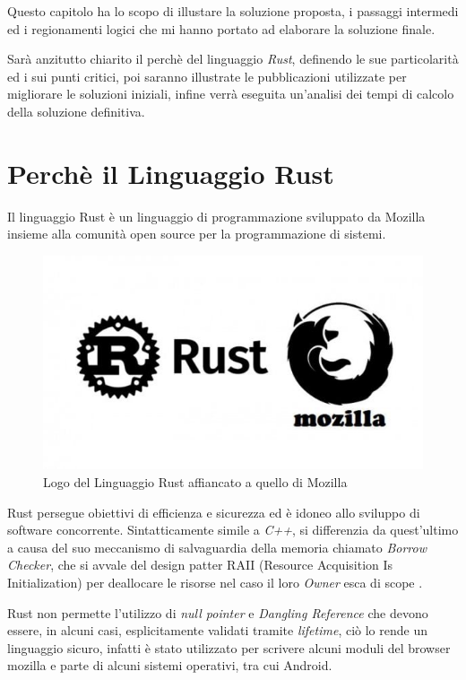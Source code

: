 Questo capitolo ha lo scopo di illustare la soluzione proposta, i passaggi intermedi ed i regionamenti logici che mi hanno portato ad elaborare la soluzione finale.

Sarà anzitutto chiarito il perchè del linguaggio \textit{Rust}, definendo le sue particolarità ed i sui punti critici, poi saranno illustrate le pubblicazioni utilizzate per migliorare le soluzioni iniziali, infine verrà eseguita un'analisi dei tempi di calcolo della soluzione definitiva.

\section{Perchè il Linguaggio Rust}
Il linguaggio Rust è un linguaggio di programmazione sviluppato da Mozilla insieme alla comunità open source per la programmazione di sistemi.

\begin{figure}
    \centering
    \includegraphics[scale=0.5]{images/rustlang.jpg}
    \caption{Logo del Linguaggio Rust affiancato a quello di Mozilla}
    \label{fig:rustlang1}
\end{figure}

Rust persegue obiettivi di efficienza e sicurezza ed è idoneo allo sviluppo di software concorrente. Sintatticamente simile a \textit{C++}, si differenzia da quest'ultimo a causa del suo meccanismo di salvaguardia della memoria chiamato \textit{Borrow Checker}, che si avvale del design patter \textsc{RAII} (Resource Acquisition Is Initialization) per deallocare le risorse nel caso il loro \textit{Owner} esca di scope \cite{10.5555/3271463}.

Rust non permette l'utilizzo di \textit{null pointer} e \textit{Dangling Reference} che devono essere, in alcuni casi, esplicitamente validati tramite \textit{lifetime}, ciò lo rende un linguaggio sicuro, infatti è stato utilizzato per scrivere alcuni moduli del browser mozilla e parte di alcuni sistemi operativi, tra cui Android.

